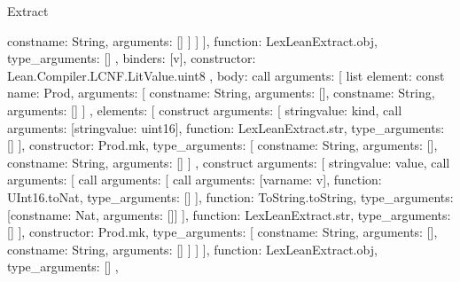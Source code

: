 \begin{lexlean}{Extract}
\begin{toolingmodule}
{{{{{{{                        const{name: String, arguments: []}
                      ]
                    }
                  ]
                }
              ],
              function: LexLeanExtract.obj,
              type_arguments: []
            },
            binders: [v],
            constructor: Lean.Compiler.LCNF.LitValue.uint8
          },
          {
            body: call{
              arguments: [
                list{
                  element: const{
                    name: Prod,
                    arguments: [
                      const{name: String, arguments: []},
                      const{name: String, arguments: []}
                    ]
                  },
                  elements: [
                    construct{
                      arguments: [
                        string{value: kind},
                        call{
                          arguments: [string{value: uint16}],
                          function: LexLeanExtract.str,
                          type_arguments: []
                        }
                      ],
                      constructor: Prod.mk,
                      type_arguments: [
                        const{name: String, arguments: []},
                        const{name: String, arguments: []}
                      ]
                    },
                    construct{
                      arguments: [
                        string{value: value},
                        call{
                          arguments: [
                            call{
                              arguments: [
                                call{
                                  arguments: [var{name: v}],
                                  function: UInt16.toNat,
                                  type_arguments: []
                                }
                              ],
                              function: ToString.toString,
                              type_arguments: [const{name: Nat, arguments: []}]
                            }
                          ],
                          function: LexLeanExtract.str,
                          type_arguments: []
                        }
                      ],
                      constructor: Prod.mk,
                      type_arguments: [
                        const{name: String, arguments: []},
                        const{name: String, arguments: []}
                      ]
                    }
                  ]
                }
              ],
              function: LexLeanExtract.obj,
              type_arguments: []
            },
}}}}
\end{toolingmodule}
\end{lexlean}
